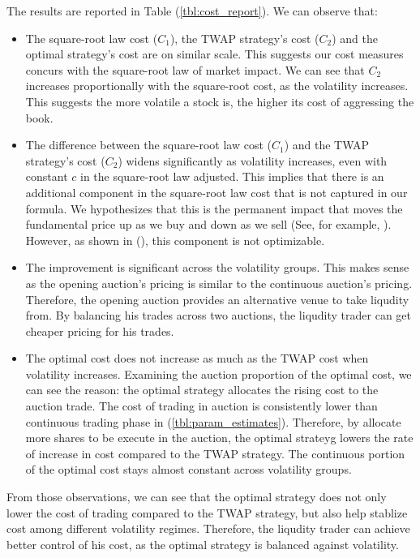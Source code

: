 \documentclass{article}
\begin{document}
The results are reported in Table (\ref{tbl:cost_report}). We can observe that:
\begin{itemize}
  \item The square-root law cost ($C_1$), the TWAP strategy's cost ($C_2$) and the optimal strategy's cost are on similar scale. This suggests our cost measures concurs with the square-root law of market impact. We can see that $C_2$ increases proportionally with the square-root cost, as the volatility increases. This suggests the more volatile a stock is, the higher its cost of aggressing the book.
  \item The difference between the square-root law cost ($C_1$) and the TWAP strategy's cost ($C_2$) widens significantly as volatility increases, even with constant $c$ in the square-root law adjusted. This implies that there is an additional component in the square-root law cost that is not captured in our formula. We hypothesizes that this is the permanent impact that moves the fundamental price up as we buy and down as we sell (See, for example, \cite{Kyle1985}). However, as shown in (\cite{AlmgrenChriss2000}), this component is not optimizable.
  \item The improvement is significant across the volatility groups. This makes sense as the opening auction's pricing is similar to the continuous auction's pricing. Therefore, the opening auction provides an alternative venue to take liqudity from. By balancing his trades across two auctions, the liqudity trader can get cheaper pricing for his trades. 
  \item The optimal cost does not increase as much as the TWAP cost when volatility increases. Examining the auction proportion of the optimal cost, we can see the reason: the optimal strategy allocates the rising cost to the auction trade. The cost of trading in auction is consistently lower than continuous trading phase in (\ref{tbl:param_estimates}). Therefore, by allocate more shares to be execute in the auction, the optimal strateyg lowers the rate of increase in cost compared to the TWAP strategy. The continuous portion of the optimal cost stays almost constant across volatility groups.
\end{itemize}

From those observations, we can see that the optimal strategy does not only lower the cost of trading compared to the TWAP strategy, but also help stablize cost among different volatility regimes. Therefore, the liqudity trader can achieve better control of his cost, as the optimal strategy is balanced against volatility.
\end{document}
